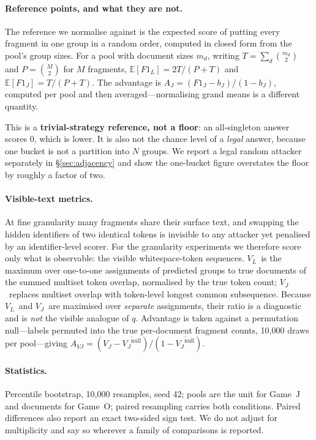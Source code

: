 \documentclass[sigconf,nonacm]{acmart}
\newcommand{\FJ}{\ensuremath{F1_J}}
\newcommand{\FL}{\ensuremath{F1_L}}
\newcommand{\AJ}{\ensuremath{A_J}}
\newcommand{\AVJ}{\ensuremath{A_{VJ}}}
\newcommand{\VJ}{\ensuremath{V_J}}
\newcommand{\VL}{\ensuremath{V_L}}
\begin{document}
\paragraph{Reference points, and what they are not.}
The reference we normalise against is the expected score of putting every
fragment in one group in a random order, computed in closed form from the pool's
group sizes. For a pool with document sizes $m_d$, writing
$T=\sum_d \binom{m_d}{2}$ and $P=\binom{M}{2}$ for $M$ fragments,
$\mathbb{E}[\FL] = 2T/(P+T)$ and $\mathbb{E}[\FJ] = T/(P+T)$. The advantage is
$\AJ = (\FJ - b_J)/(1 - b_J)$, computed per pool and then averaged---normalising
grand means is a different quantity.

This is a \textbf{trivial-strategy reference, not a floor}: an all-singleton
answer scores $0$, which is lower. It is also not the chance level of a
\emph{legal} answer, because one bucket is not a partition into $N$ groups. We
report a legal random attacker separately in \S\ref{sec:adjacency} and show the
one-bucket figure overstates the floor by roughly a factor of two.

\paragraph{Visible-text metrics.}
At fine granularity many fragments share their surface text, and swapping the
hidden identifiers of two identical tokens is invisible to any attacker yet
penalised by an identifier-level scorer. For the granularity experiments we
therefore score only what is observable: the visible whitespace-token sequences.
\VL\ is the maximum over one-to-one assignments of predicted groups to true
documents of the summed multiset token overlap, normalised by the true token
count; \VJ\ replaces multiset overlap with token-level longest common
subsequence. Because \VL\ and \VJ\ are maximised over \emph{separate}
assignments, their ratio is a diagnostic and is \emph{not} the visible analogue
of $q$. Advantage is taken against a permutation null---labels permuted into the
true per-document fragment counts, 10{,}000 draws per pool---giving
$\AVJ = (\VJ - \overline{\VJ^{\text{null}}})/(1-\overline{\VJ^{\text{null}}})$.

\paragraph{Statistics.}
Percentile bootstrap, 10{,}000 resamples, seed 42; pools are the unit for
Game~J and documents for Game~O; paired resampling carries both conditions.
Paired differences also report an exact two-sided sign test. We do not adjust for
multiplicity and say so wherever a family of comparisons is reported.
\end{document}
